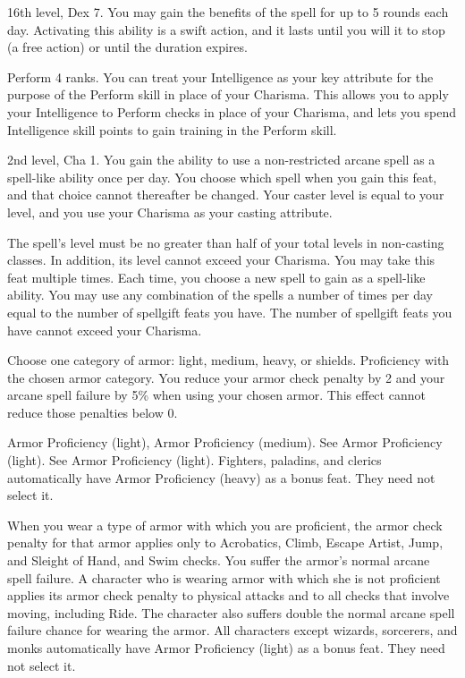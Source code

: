 \featpre 16th level, Dex 7.
\featben You may gain the benefits of the  spell for up to 5 rounds each day. Activating this ability is a swift action, and it lasts until you will it to stop (a free action) or until the duration expires.

\featpre Perform 4 ranks.
\featben You can treat your Intelligence as your key attribute for the purpose of the Perform skill in place of your Charisma. This allows you to apply your Intelligence to Perform checks in place of your Charisma, and lets you spend Intelligence skill points to gain training in the Perform skill.

\featpre 2nd level, Cha 1.
\featben You gain the ability to use a non-restricted arcane spell as a spell-like ability once per day. You choose which spell when you gain this feat, and that choice cannot thereafter be changed. Your caster level is equal to your level, and you use your Charisma as your casting attribute.

The spell's level must be no greater than half of your total levels in non-casting classes. In addition, its level cannot exceed your Charisma.
 You may take this feat multiple times. Each time, you choose a new spell to gain as a spell-like ability. You may use any combination of the spells a number of times per day equal to the number of spellgift feats you have. The number of spellgift feats you have cannot exceed your Charisma.

Choose one category of armor: light, medium, heavy, or shields.
 Proficiency with the chosen armor category.
 You reduce your armor check penalty by 2 and your arcane spell failure by 5\% when using your chosen armor. This effect cannot reduce those penalties below 0.

 Armor Proficiency (light), Armor Proficiency (medium).
 See Armor Proficiency (light).
 See Armor Proficiency (light).
 Fighters, paladins, and clerics automatically have Armor Proficiency (heavy) as a bonus feat. They need not select it.

 When you wear a type of armor with which you are proficient, the armor check penalty for that armor applies only to Acrobatics, Climb, Escape Artist, Jump, and Sleight of Hand, and Swim checks. You suffer the armor's normal arcane spell failure.
 A character who is wearing armor with which she is not proficient applies its armor check penalty to physical attacks and to all checks that involve moving, including Ride. The character also suffers double the normal arcane spell failure chance for wearing the armor.
 All characters except wizards, sorcerers, and monks automatically have Armor Proficiency (light) as a bonus feat. They need not select it.

